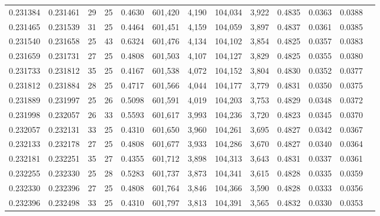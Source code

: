 \begin{tabular}{rrrrrrrrrrrrr}
0.231384 & 0.231461 &  29 &  25 &                                     0.4630 & 601,420 &   4,190 & 104,034 &   3,922 & 0.4835 & 0.0363 & 0.0388 \\
0.231465 & 0.231539 &  31 &  25 &                                     0.4464 & 601,451 &   4,159 & 104,059 &   3,897 & 0.4837 & 0.0361 & 0.0385 \\
0.231540 & 0.231658 &  25 &  43 &                                     0.6324 & 601,476 &   4,134 & 104,102 &   3,854 & 0.4825 & 0.0357 & 0.0383 \\
0.231659 & 0.231731 &  27 &  25 &                                     0.4808 & 601,503 &   4,107 & 104,127 &   3,829 & 0.4825 & 0.0355 & 0.0380 \\
0.231733 & 0.231812 &  35 &  25 &                                     0.4167 & 601,538 &   4,072 & 104,152 &   3,804 & 0.4830 & 0.0352 & 0.0377 \\
0.231812 & 0.231884 &  28 &  25 &                                     0.4717 & 601,566 &   4,044 & 104,177 &   3,779 & 0.4831 & 0.0350 & 0.0375 \\
0.231889 & 0.231997 &  25 &  26 &                                     0.5098 & 601,591 &   4,019 & 104,203 &   3,753 & 0.4829 & 0.0348 & 0.0372 \\
0.231998 & 0.232057 &  26 &  33 &                                     0.5593 & 601,617 &   3,993 & 104,236 &   3,720 & 0.4823 & 0.0345 & 0.0370 \\
0.232057 & 0.232131 &  33 &  25 &                                     0.4310 & 601,650 &   3,960 & 104,261 &   3,695 & 0.4827 & 0.0342 & 0.0367 \\
0.232133 & 0.232178 &  27 &  25 &                                     0.4808 & 601,677 &   3,933 & 104,286 &   3,670 & 0.4827 & 0.0340 & 0.0364 \\
0.232181 & 0.232251 &  35 &  27 &                                     0.4355 & 601,712 &   3,898 & 104,313 &   3,643 & 0.4831 & 0.0337 & 0.0361 \\
0.232255 & 0.232330 &  25 &  28 &                                     0.5283 & 601,737 &   3,873 & 104,341 &   3,615 & 0.4828 & 0.0335 & 0.0359 \\
0.232330 & 0.232396 &  27 &  25 &                                     0.4808 & 601,764 &   3,846 & 104,366 &   3,590 & 0.4828 & 0.0333 & 0.0356 \\
0.232396 & 0.232498 &  33 &  25 &                                     0.4310 & 601,797 &   3,813 & 104,391 &   3,565 & 0.4832 & 0.0330 & 0.0353 \\

\end{tabular}
